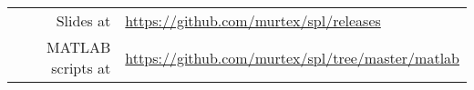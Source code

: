 
\title[\metabrief]{\metatitle}
\subtitle{\metasubject}

\author{\metaauthor\\[0.5ex]\small{(\href{mailto:kuberski@uni-potsdam.de}{\nolinkurl{kuberski@uni-potsdam.de}})}}
\date{\metadate}

\begin{frame}
	\titlepage
	\begin{center}
		\small
		\begin{tabular}{rl}
			Slides at&\url{https://github.com/murtex/spl/releases}\\
			MATLAB scripts at&\url{https://github.com/murtex/spl/tree/master/matlab}
		\end{tabular}
	\end{center}
\end{frame}

